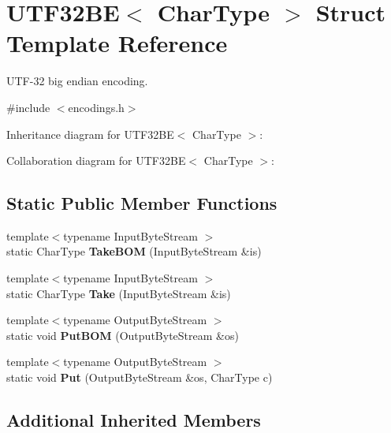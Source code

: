 \hypertarget{struct_u_t_f32_b_e}{}\section{U\+T\+F32\+BE$<$ Char\+Type $>$ Struct Template Reference}
\label{struct_u_t_f32_b_e}


U\+T\+F-\/32 big endian encoding.  




{\ttfamily \#include $<$encodings.\+h$>$}



Inheritance diagram for U\+T\+F32\+BE$<$ Char\+Type $>$\+:


Collaboration diagram for U\+T\+F32\+BE$<$ Char\+Type $>$\+:
\subsection*{Static Public Member Functions}
\begin{DoxyCompactItemize}
\item 
\mbox{\label{struct_u_t_f32_b_e_a07d228f51ad43ef83af2529ca4bd1181}} 
{\footnotesize template$<$typename Input\+Byte\+Stream $>$ }\\static Char\+Type {\bfseries Take\+B\+OM} (Input\+Byte\+Stream \&is)
\item 
\mbox{\label{struct_u_t_f32_b_e_ace3086ece3b13417c758b5abcf3016c8}} 
{\footnotesize template$<$typename Input\+Byte\+Stream $>$ }\\static Char\+Type {\bfseries Take} (Input\+Byte\+Stream \&is)
\item 
\mbox{\label{struct_u_t_f32_b_e_a8b1a216dd267ff06a9000cbe593ebd24}} 
{\footnotesize template$<$typename Output\+Byte\+Stream $>$ }\\static void {\bfseries Put\+B\+OM} (Output\+Byte\+Stream \&os)
\item 
\mbox{\label{struct_u_t_f32_b_e_ad270b8b016d477f7f7354df535fa28c5}} 
{\footnotesize template$<$typename Output\+Byte\+Stream $>$ }\\static void {\bfseries Put} (Output\+Byte\+Stream \&os, Char\+Type c)
\end{DoxyCompactItemize}
\subsection*{Additional Inherited Members}


